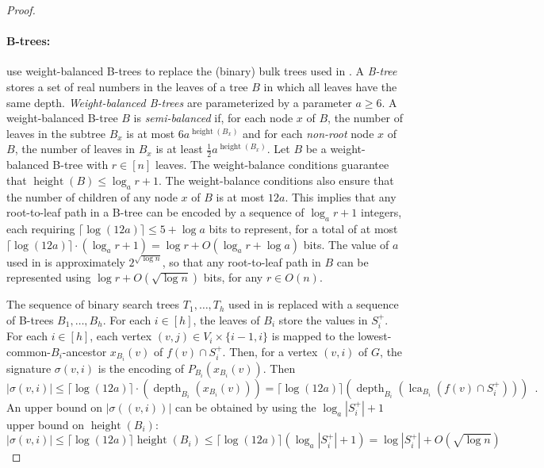 \documentclass[twoside,leqno]{article}
\renewcommand{\ge}{\geqslant}
\renewcommand{\le}{\leqslant}
\newcommand{\defin}[1]{\emph{\textcolor{brightmaroon}{#1}}}
\DeclareMathOperator{\height}{height}
\DeclareMathOperator{\depth}{depth}
\DeclareMathOperator{\lca}{lca}
\newcommand{\Oh}{O}
\begin{document}
\begin{proof}
  \paragraph{B-trees:}
  \citet{gawrychowski.janczewski:simpler} use
  weight-balanced B-trees to replace the (binary) bulk trees used in \cite{dujmovic.esperet.ea:adjacency}.
  A \defin{B-tree} stores a set of real numbers in the leaves of a tree $B$ in which all leaves have the same depth.
  \defin{Weight-balanced B-trees} are parameterized by a parameter $a\ge 6$.  A weight-balanced B-tree $B$ is \defin{semi-balanced} if, for each node $x$ of $B$, the number of leaves in the subtree $B_x$ is at most $6a^{\height(B_x)}$ and for each \emph{non-root} node $x$ of $B$, the number of leaves in $B_x$ is at least $\tfrac{1}{2}a^{\height(B_x)}$.
  Let $B$ be a weight-balanced B-tree with $r\in [n]$ leaves.  The weight-balance conditions guarantee that $\height(B)\le \log_a r + 1$.
  The weight-balance conditions also ensure that the number of children of any node $x$ of $B$ is at most $12a$.
  This implies that any root-to-leaf path in a B-tree can be encoded by a sequence of $\log_a r+1$ integers, each requiring $\lceil\log(12a)\rceil\le 5+\log a$ bits to represent, for a total of at most $\lceil\log(12a)\rceil\cdot(\log_a r+1)=\log r + \Oh(\log_a r + \log a)$ bits.
  The value of $a$ used in \cite{gawrychowski.janczewski:simpler} is approximately $2^{\sqrt{\log n}}$, so that any root-to-leaf path in $B$ can be represented using $\log r + \Oh(\sqrt{\log n})$ bits, for any $r\in\Oh(n)$.

  The sequence of binary search trees $T_1,\ldots,T_h$ used in \cite{gawrychowski.janczewski:simpler} is replaced with a sequence of B-trees $B_1,\ldots,B_h$.
  For each $i\in[h]$, the leaves of $B_i$ store the values in $S^+_i$.
  For each $i\in[h]$, each vertex $(v,j)\in V_i\times\{i-1,i\}$ is mapped to the lowest-common-$B_i$-ancestor $x_{B_i}(v)$ of $f(v)\cap S^+_i$.
  Then, for a vertex $(v,i)$ of $G$, the signature \defin{$\sigma(v,i)$} is the encoding of $P_{B_i}(x_{B_i}(v))$.
  Then
  \[
    |\sigma(v,i)| \le \lceil\log (12a)\rceil\cdot(\depth_{B_i}(x_{B_i}(v))) = \lceil\log (12a)\rceil(\depth_{B_i}(\lca_{B_i}(f(v)\cap S_i^+))) \enspace .
  \]
  An upper bound on $|\sigma((v,i))|$ can be obtained by using the $\log_a |S^+_i|+1$ upper bound on $\height(B_i)$:
  \[
    |\sigma(v,i)|\le \lceil\log (12a)\rceil\height(B_i) \le \lceil\log (12a)\rceil(\log_a |S^+_i| + 1)= \log |S^+_i| + \Oh(\sqrt{\log n})
  \]


\end{proof}
\end{document}

